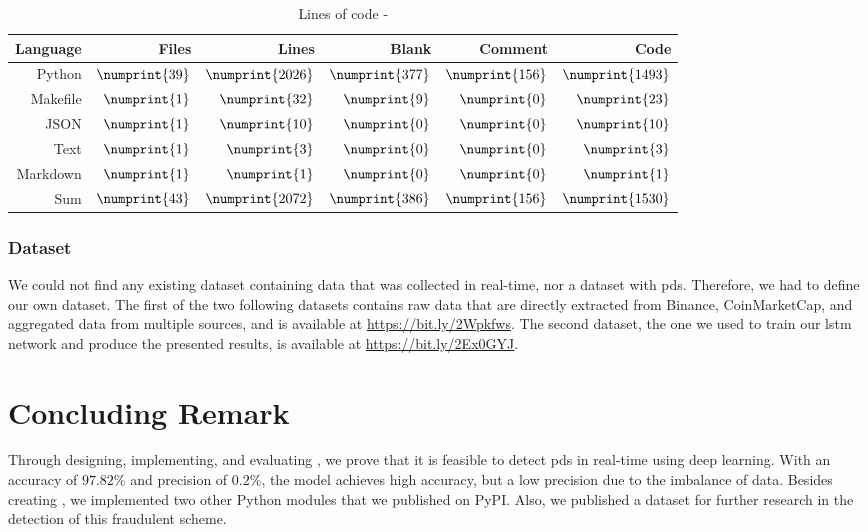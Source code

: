 \begin{table}[ht]
        \centering
        \begin{tabularx}{\textwidth}{ |R|R|R|R|R|R| }\hline
        Language    & Files             & Lines             & Blank             & Comment           & Code              \\\hline
        Python      & $\numprint{39}$   & $\numprint{2026}$ & $\numprint{377}$  & $\numprint{156}$  & $\numprint{1493}$ \\
        Makefile    & $\numprint{1}$    & $\numprint{32}$   & $\numprint{9}$    & $\numprint{0}$    & $\numprint{23}$   \\
        JSON        & $\numprint{1}$    & $\numprint{10}$   & $\numprint{0}$    & $\numprint{0}$    & $\numprint{10}$   \\
        Text        & $\numprint{1}$    & $\numprint{3}$    & $\numprint{0}$    & $\numprint{0}$    & $\numprint{3}$    \\
        Markdown    & $\numprint{1}$    & $\numprint{1}$    & $\numprint{0}$    & $\numprint{0}$    & $\numprint{1}$    \\\hline
        Sum         & $\numprint{43}$   & $\numprint{2072}$ & $\numprint{386}$  & $\numprint{156}$  & $\numprint{1530}$ \\\hline
        \end{tabularx}
        \caption{Lines of code - \project}
        \label{tab:cloc_thesis}
\end{table}

\subsubsection{Dataset}
We could not find any existing dataset containing data that was collected in real-time, nor a dataset with \acp{pd}. Therefore, we had to define our own dataset. The first of the two following datasets contains raw data that are directly extracted from Binance, CoinMarketCap, and aggregated data from multiple sources, and is available at \url{https://bit.ly/2Wpkfws}. The second dataset, the one we used to train our \ac{lstm} network and produce the presented results, is available at \url{https://bit.ly/2Ex0GYJ}.

\section{Concluding Remark}
Through designing, implementing, and evaluating \project, we prove that it is feasible to detect \acp{pd} in real-time using deep learning. With an accuracy of $97.82\%$ and precision of $0.2\%$, the model achieves high accuracy, but a low precision due to the imbalance of data. Besides creating \project, we implemented two other Python modules that we published on PyPI. Also, we published a dataset for further research in the detection of this fraudulent scheme.

